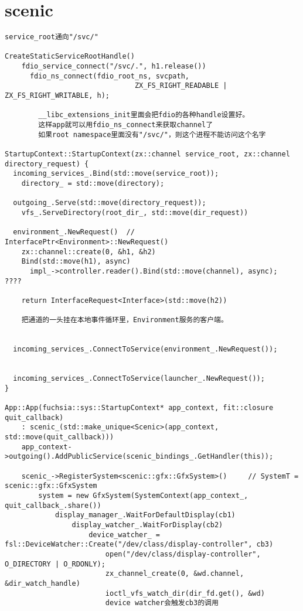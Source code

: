 \section{scenic}

\begin{verbatim}
service_root通向"/svc/"

CreateStaticServiceRootHandle()
    fdio_service_connect("/svc/.", h1.release())
      fdio_ns_connect(fdio_root_ns, svcpath,
                               ZX_FS_RIGHT_READABLE | ZX_FS_RIGHT_WRITABLE, h);

        __libc_extensions_init里面会把fdio的各种handle设置好。
        这样app就可以用fdio_ns_connect来获取channel了
        如果root namespace里面没有"/svc/"，则这个进程不能访问这个名字

StartupContext::StartupContext(zx::channel service_root, zx::channel directory_request) {
  incoming_services_.Bind(std::move(service_root));
    directory_ = std::move(directory);
  
  outgoing_.Serve(std::move(directory_request));
    vfs_.ServeDirectory(root_dir_, std::move(dir_request))
  
  environment_.NewRequest()  // InterfacePtr<Environment>::NewRequest()
    zx::channel::create(0, &h1, &h2)
    Bind(std::move(h1), async)
      impl_->controller.reader().Bind(std::move(channel), async);  ????
    
    return InterfaceRequest<Interface>(std::move(h2))

    把通道的一头挂在本地事件循环里，Environment服务的客户端。


  incoming_services_.ConnectToService(environment_.NewRequest());


  incoming_services_.ConnectToService(launcher_.NewRequest());
}

App::App(fuchsia::sys::StartupContext* app_context, fit::closure quit_callback)
    : scenic_(std::make_unique<Scenic>(app_context, std::move(quit_callback)))
    app_context->outgoing().AddPublicService(scenic_bindings_.GetHandler(this));
    
    scenic_->RegisterSystem<scenic::gfx::GfxSystem>()     // SystemT = scenic::gfx::GfxSystem
        system = new GfxSystem(SystemContext(app_context_, quit_callback_.share())
            display_manager_.WaitForDefaultDisplay(cb1)
                display_watcher_.WaitForDisplay(cb2)
                    device_watcher_ = fsl::DeviceWatcher::Create("/dev/class/display-controller", cb3)
                        open("/dev/class/display-controller", O_DIRECTORY | O_RDONLY);
                        zx_channel_create(0, &wd.channel, &dir_watch_handle)
                        ioctl_vfs_watch_dir(dir_fd.get(), &wd)
                        device watcher会触发cb3的调用


\end{verbatim}
